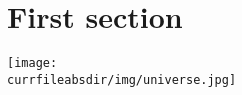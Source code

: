 \documentclass[12pt, a4paper]{article}
\begin{document}
\section{First section}

\blindtext[1]
\texttt{[image: \\currfileabsdir/img/universe.jpg]}
\blindtext[1]

\vspace{8mm}

\blindtext[1]

% 
% 


\blindtext[1]
\end{document}
